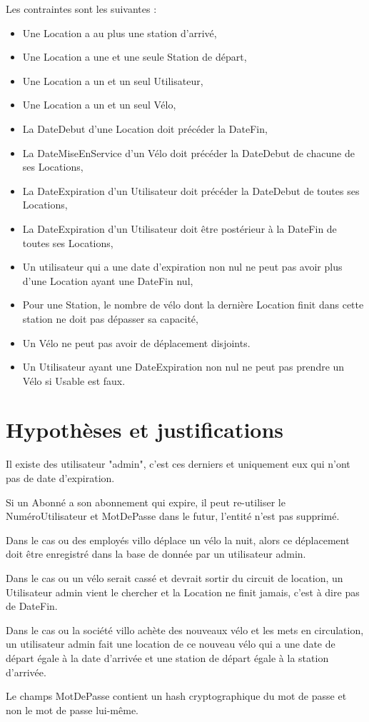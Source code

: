 \documentclass[a4paper,10pt]{article}
\begin{document}
Les contraintes sont les suivantes :
\begin{itemize}
  \item Une Location a au plus une station d'arrivé,
  \item Une Location a une et une seule Station de départ,
  \item Une Location a un et un seul Utilisateur,
  \item Une Location a un et un seul Vélo,
  \item La DateDebut d'une Location doit précéder la DateFin, 
  \item La DateMiseEnService d'un Vélo doit précéder la DateDebut de chacune de ses Locations,
  \item La DateExpiration d'un Utilisateur doit précéder la DateDebut de toutes ses Locations,
  \item La DateExpiration d'un Utilisateur doit \^etre postérieur à la DateFin de toutes ses Locations,
  \item Un utilisateur qui a une date d'expiration non nul ne peut pas avoir plus d'une Location ayant une DateFin nul,
  \item Pour une Station, le nombre de vélo dont la dernière Location finit  dans cette station ne doit pas dépasser sa capacité,
  \item Un Vélo ne peut pas avoir de déplacement disjoints.
  \item Un Utilisateur ayant une DateExpiration non nul ne peut pas prendre un Vélo si Usable est faux.
\end{itemize}

\section{Hypothèses et justifications}

Il existe des utilisateur "admin", c'est ces derniers et uniquement eux qui n'ont pas de date d'expiration.

Si un Abonné a son abonnement qui expire, il peut re-utiliser le NuméroUtilisateur et MotDePasse dans le futur, l'entité n'est pas supprimé.

Dans le cas ou des employés villo déplace un vélo la nuit, alors ce déplacement doit être enregistré dans la base de donnée par un utilisateur admin.

Dans le cas ou un vélo serait cassé et devrait sortir du circuit de location, un Utilisateur admin vient le chercher et la Location ne finit jamais, c'est à dire pas de DateFin.

Dans le cas ou la société villo achète des nouveaux vélo et les mets en circulation, un utilisateur admin fait une location de ce nouveau vélo qui a une date de départ égale à la date d'arrivée et une station de départ égale à la station d'arrivée.

Le champs MotDePasse contient un hash cryptographique du mot de passe et non le mot de passe lui-m\^eme.
\end{document}
